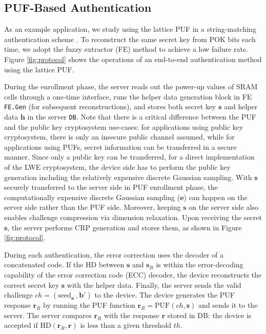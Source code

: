 \subsection{PUF-Based Authentication}
As an example application, we study using the lattice PUF in a string-matching authentication scheme \cite{suh2007physical}. 
To reconstruct the same secret key from POK bits each time, we adopt the fuzzy extractor (FE) \cite{bosch2008efficient} method to achieve a low failure rate. 
Figure \ref{fig:protocol} shows the operations of an end-to-end authentication method using the lattice PUF. 


During the enrollment phase, the server reads out the power-up values of SRAM cells through a one-time interface, runs the helper data generation block in FE \texttt{FE.Gen} (for subsequent reconstructions), and stores both secret key $\mathbf{s}$ and helper data $\mathbf{h}$ in the server \texttt{DB}.
Note that there is a critical difference between the PUF and the public key cryptosystem use-cases:
for applications using public key cryptosystem, there is only an insecure public channel assumed,
while for applications using PUFs, secret information can be transferred in a secure manner.
Since only a public key can be transferred, for a direct implementation of the LWE cryptosystem, the device side has to perform the public key generation including the relatively expensive discrete Gaussian sampling. 
With $\mathbf{s}$ securely transferred to the server side in PUF enrollment phase, the computationally expensive discrete Gaussian sampling ($\mathbf{e}$) can happen on the server side rather than the PUF side.
Moreover, keeping $\mathbf{s}$ on the server side also enables challenge compression via dimension relaxation. 
Upon receiving the secret $\mathbf{s}$, the server performs CRP generation and stores them, as shown in Figure \ref{fig:protocol}.

During each authentication, the error correction uses the decoder of a concatenated code. 
If the HD between $\mathbf{s}$ and $\mathbf{s}_R$ is within the error-decoding capability of the error correction code (ECC) decoder, the device reconstructs the correct secret key $\mathbf{s}$ with the helper data. 
Finally, the server sends the valid challenge $ch=(\text{seed}_{\mathbf{a}^\prime}, \mathbf{b}')$ to the device. 
The device generates the PUF response $\mathbf{r}_R$ by running the PUF function $\mathbf{r}_R = \text{PUF}(ch, \mathbf{s})$ and sends it to the server. 
The server compares $\mathbf{r}_R$ with the response $\mathbf{r}$ stored in DB:
the device is accepted if $\text{HD}(\mathbf{r}_R, \mathbf{r})$ is less than a given threshold $th$.
